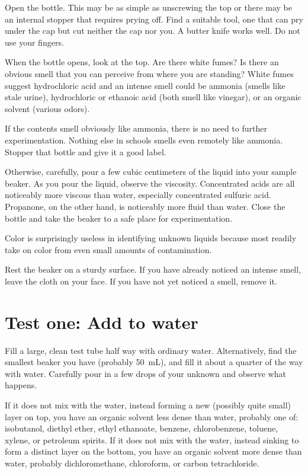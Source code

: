 Open the bottle. 
This may be as simple as unscrewing the top 
or there may be an internal stopper that requires prying off. 
Find a suitable tool, 
one that can pry under the cap but cut neither the cap nor you. 
A butter knife works well. 
Do not use your fingers.

When the bottle opens, 
look at the top. 
Are there white fumes? 
Is there an obvious smell that you can perceive 
from where you are standing? 
White fumes suggest hydrochloric acid 
and an intense smell could be ammonia (smells like stale urine), 
hydrochloric or ethanoic acid (both smell like vinegar), 
or an organic solvent (various odors).

If the contents smell obviously like ammonia, 
there is no need to further experimentation. 
Nothing else in schools smells even remotely like ammonia. 
Stopper that bottle and give it a good label.

Otherwise, 
carefully, 
pour a few cubic centimeters 
of the liquid into your sample beaker. 
As you pour the liquid, 
observe the viscosity. 
Concentrated acids are all noticeably more viscous than water, 
especially concentrated sulfuric acid. 
Propanone, 
on the other hand, 
is noticeably more fluid than water. 
Close the bottle and take the beaker 
to a safe place for experimentation.

Color is surprisingly useless in identifying unknown liquids 
because most readily take on color 
from even small amounts of contamination.

Rest the beaker on a sturdy surface. 
If you have already noticed an intense smell, 
leave the cloth on your face. 
If you have not yet noticed a smell, 
remove it.

\section{Test one: Add to water}

Fill a large, 
clean test tube half way with ordinary water. 
Alternatively, 
find the smallest beaker you have (probably 50~mL), 
and fill it about a quarter of the way with water. 
Carefully pour in a few drops of your unknown 
and observe what happens. 


If it does not mix with the water, 
instead forming a new (possibly quite small) layer on top, 
you have an organic solvent less dense than water, 
probably one of: isobutanol, 
diethyl ether, 
ethyl ethanoate, 
benzene, 
chlorobenzene, 
toluene, 
xylene, 
or petroleum spirits. 
If it does not mix with the water, 
instead sinking to form a distinct layer on the bottom, 
you have an organic solvent more dense than water, 
probably dichloromethane, 
chloroform, 
or carbon tetrachloride.

